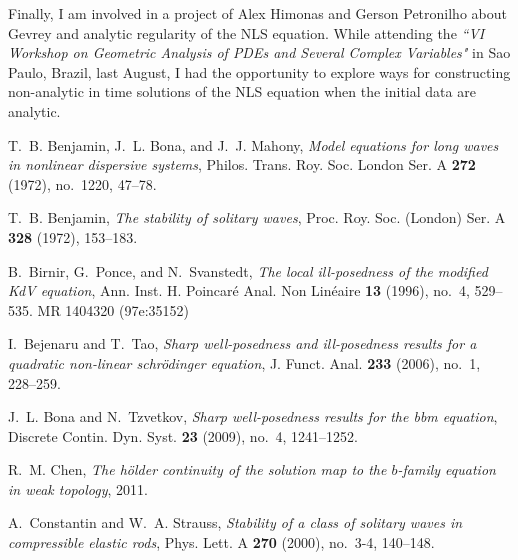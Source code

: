 \documentclass[12pt,reqno]{amsart}
\begin{document}
Finally, I am involved in a project of Alex Himonas 
and Gerson Petronilho about  Gevrey
and analytic regularity of the NLS equation.
While attending the {\em ``VI Workshop on Geometric Analysis of PDEs and Several Complex Variables"} \/in Sao Paulo, Brazil, last August,
I had the opportunity to explore ways for constructing
non-analytic in time solutions of the NLS equation
when the initial data are analytic. 
\providecommand{\bysame}{\leavevmode\hbox to3em{\hrulefill}\thinspace}
\providecommand{\MR}{\relax\ifhmode\unskip\space\fi MR }
\providecommand{\MRhref}[2]{%
  \href{http://www.ams.org/mathscinet-getitem?mr=#1}{#2}
}
\providecommand{\href}[2]{#2}
\begin{thebibliography}{dLKT07}

T.~B. Benjamin, J.~L. Bona, and J.~J. Mahony, \emph{Model equations for long
  waves in nonlinear dispersive systems}, Philos. Trans. Roy. Soc. London Ser.
  A \textbf{272} (1972), no.~1220, 47--78.

T.~B. Benjamin, \emph{The stability of solitary waves}, Proc. Roy. Soc.
  (London) Ser. A \textbf{328} (1972), 153--183.

B.~Birnir, G.~Ponce, and N.~Svanstedt, \emph{The local ill-posedness of the
  modified {K}d{V} equation}, Ann. Inst. H. Poincar{\'e} Anal. Non Lin{\'e}aire
  \textbf{13} (1996), no.~4, 529--535. \MR{1404320 (97e:35152)}

I.~Bejenaru and T.~Tao, \emph{Sharp well-posedness and ill-posedness results
  for a quadratic non-linear schr{\"o}dinger equation}, J. Funct. Anal.
  \textbf{233} (2006), no.~1, 228--259.

J.~L. Bona and N.~Tzvetkov, \emph{Sharp well-posedness results for the bbm
  equation}, Discrete Contin. Dyn. Syst. \textbf{23} (2009), no.~4, 1241--1252.

R.~M. Chen, \emph{The h{\"o}lder continuity of the solution map to the
  $b$-family equation in weak topology}, 2011.

A.~Constantin and W.~A. Strauss, \emph{Stability of a class of solitary waves
  in compressible elastic rods}, Phys. Lett. A \textbf{270} (2000), no.~3-4,
  140--148.


\end{thebibliography}
\end{document}
